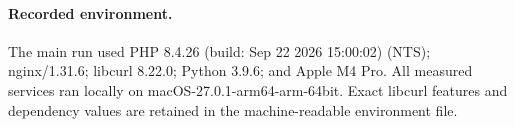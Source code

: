 \paragraph{Recorded environment.} The main run used PHP 8.4.26  (build: Sep 22 2026 15:00:02) (NTS); nginx/1.31.6; libcurl 8.22.0; Python 3.9.6; and Apple M4 Pro. All measured services ran locally on macOS-27.0.1-arm64-arm-64bit. Exact libcurl features and dependency values are retained in the machine-readable environment file.
